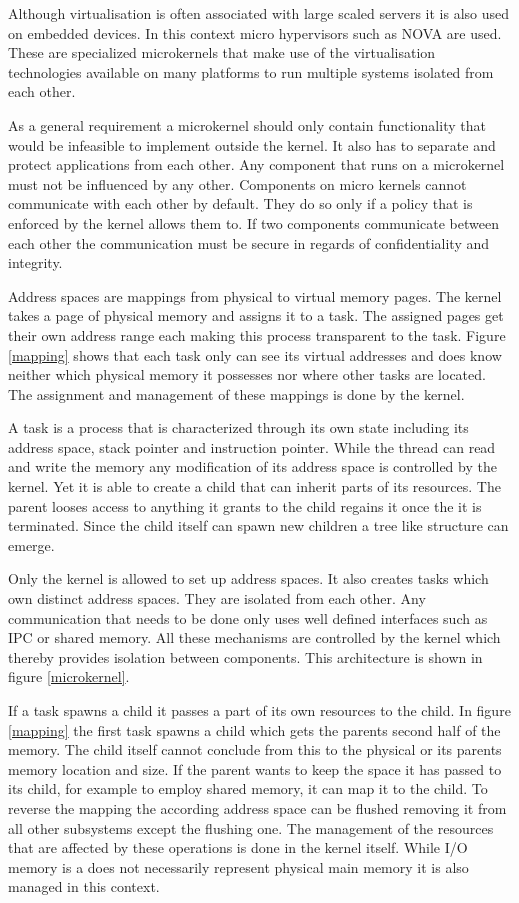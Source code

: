 \documentclass[
a4paper,
11pt,
twoside
]{report}
\begin{document}
		Although virtualisation is often associated with large scaled servers it is also used on embedded devices.
		In this context micro hypervisors such as NOVA \citep{Steinberg:2010:NMS:1755913.1755935} are used.
		These are specialized microkernels that make use of the virtualisation technologies available on many platforms to run multiple systems isolated from each other. \citep{ibmvirt}
		
		As a general requirement a microkernel should only contain functionality that would be infeasible to implement outside the kernel.
		It also has to separate and protect applications from each other.
		Any component that runs on a microkernel must not be influenced by any other.
		Components on micro kernels cannot communicate with each other by default.
		They do so only if a policy that is enforced by the kernel allows them to.
		If two components communicate between each other the communication must be secure in regards of confidentiality and integrity.
		
		Address spaces are mappings from physical to virtual memory pages.
		The kernel takes a page of physical memory and assigns it to a task.
		The assigned pages get their own address range each making this process transparent to the task.
		Figure \ref{mapping} shows that each task only can see its virtual addresses and does know neither which physical memory it possesses nor where other tasks are located.
		The assignment and management of these mappings is done by the kernel.
		
		A task is a process that is characterized through its own state including its address space, stack pointer and instruction pointer.
		While the thread can read and write the memory any modification of its address space is controlled by the kernel.
		Yet it is able to create a child that can inherit parts of its resources.
		The parent looses access to anything it grants to the child regains it once the it is terminated.
		Since the child itself can spawn new children a tree like structure can emerge.
		
		Only the kernel is allowed to set up address spaces.
		It also creates tasks which own distinct address spaces.
		They are isolated from each other.
		Any communication that needs to be done only uses well defined interfaces such as IPC or shared memory.
		All these mechanisms are controlled by the kernel which thereby provides isolation between components.
		This architecture is shown in figure \ref{microkernel}.
		
		If a task spawns a child it passes a part of its own resources to the child.
		In figure \ref{mapping} the first task spawns a child which gets the parents second half of the memory.
		The child itself cannot conclude from this to the physical or its parents memory location and size.
		If the parent wants to keep the space it has passed to its child, for example to employ shared memory, it can map it to the child.
		To reverse the mapping the according address space can be flushed removing it from all other subsystems except the flushing one.
		The management of the resources that are affected by these operations is done in the kernel itself.
		While I/O memory is a does not necessarily represent physical main memory it is also managed in this context.
		
\end{document}
